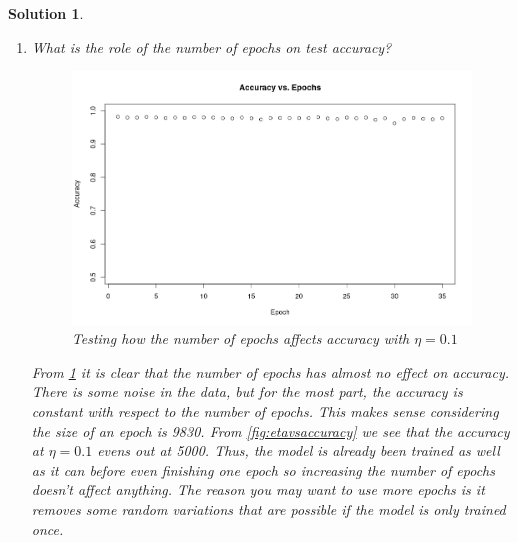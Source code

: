 \documentclass[12pt]{article}
\newtheorem*{solution*}{Solution}
\theoremstyle{definition}
\begin{document}
\begin{solution*}
\begin{enumerate}[label=\arabic*.,font=\upshape]
			\item \textnormal{What is the role of the number of epochs on test accuracy?}
			\begin{figure}[H]
				\centering
				\includegraphics[scale=0.4]{EpochVsAccuracy}
				\caption{Testing how the number of epochs affects accuracy with $\eta = 0.1$}
				\label{fig:epochvsaccuracy}
			\end{figure}
			From \cref{fig:epochvsaccuracy} it is clear that the number of epochs has almost no effect on accuracy. There is some noise in the data, but for the most part, the accuracy is constant with respect to the number of epochs. This makes sense considering the size of an epoch is 9830. From \cref{fig:etavsaccuracy} we see that the accuracy at $\eta = 0.1$ evens out at 5000. Thus, the model is already been trained as well as it can before even finishing one epoch so increasing the number of epochs doesn't affect anything. The reason you may want to use more epochs is it removes some random variations that are possible if the model is only trained once. 
		\end{enumerate}
	\end{solution*}
\end{document}

